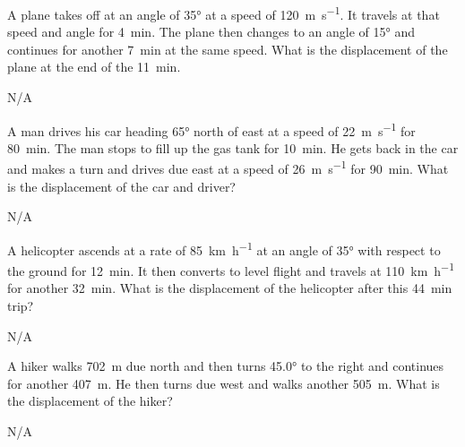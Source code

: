 


\begin{question}[ID=vectors-A-Q01,topic=vectors,difficulty=A]
    A plane takes off at an angle of \ang{35}
        at a speed of \SI{120}{\meter\per\second}.
    It travels at that speed and angle for \SI{4}{\minute}.
    The plane then changes to an angle of \ang{15}
        and continues for another \SI{7}{\minute} at the
        same speed.
    What is the displacement of the plane at the end of
        the \SI{11}{\minute}.
\end{question}
\begin{solution}
    N/A
\end{solution}


\begin{question}[ID=vectors-A-Q02,topic=vectors,difficulty=A]
    A man drives his car heading \ang{65} north of east
        at a speed of \SI{22}{\meter\per\second} for 
        \SI{80}{\minute}.
    The man stops to fill up the gas tank for \SI{10}{\minute}.
    He gets back in the car and makes a turn and drives due east
        at a speed of \SI{26}{\meter\per\second} for
        \SI{90}{\minute}.
    What is the displacement of the car and driver?
\end{question}
\begin{solution}
    N/A
\end{solution}


\begin{question}[ID=vectors-A-Q03,difficulty=A]
    A helicopter ascends at a rate of \SI{85}{\kilo\meter\per\hour}
        at an angle of \ang{35} with respect to the ground
        for \SI{12}{\minute}.
    It then converts to level flight and travels at
        \SI{110}{\kilo\meter\per\hour} for another
        \SI{32}{\minute}.
    What is the displacement of the helicopter after this
        \SI{44}{\minute} trip?
\end{question}
\begin{solution}
    N/A
\end{solution}

\begin{question}[ID=vectors-B-Q01,topic=vectors,difficulty=B]
    A hiker walks \SI{702}{\meter} due north and then turns
        \ang{45.0} to the right and continues for
        another \SI{407}{\meter}.
    He then turns due west and walks another \SI{505}{\meter}.
    What is the displacement of the hiker?
\end{question}
\begin{solution}
    N/A
\end{solution}


